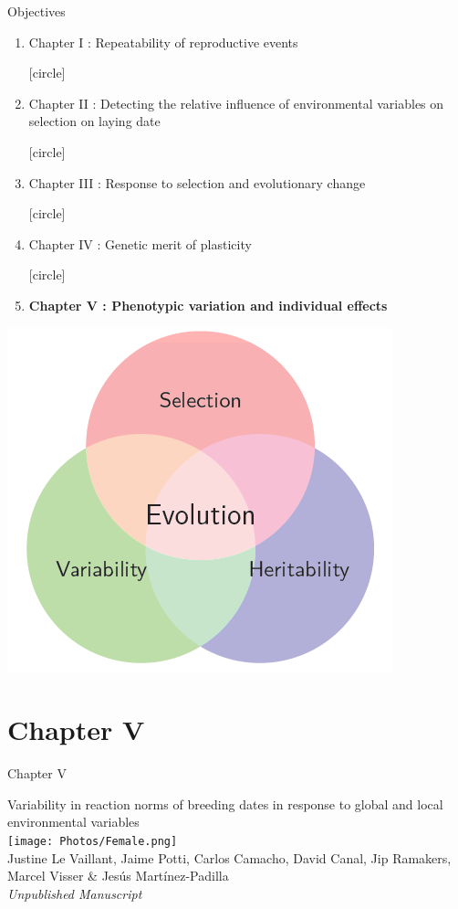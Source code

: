 \documentclass[compress]{beamer}
\begin{document}
\begin{frame}{Objectives}
   \begin{enumerate}
  [circle]
\item \normalsize Chapter I : Repeatability of reproductive events
\vspace{0.3cm}

  [circle]
\item \normalsize Chapter II : Detecting the relative influence of environmental variables on selection on laying date  
\vspace{0.3cm}

  [circle]
\item \normalsize Chapter III : Response to selection and evolutionary change
\vspace{0.3cm}

  [circle]
\item \normalsize Chapter IV : Genetic merit of plasticity 
\vspace{0.3cm}

  [circle]
\item \normalsize \textbf{Chapter V : Phenotypic variation and individual effects}
\end{enumerate}

\vspace{0.5cm}
\centering
  \includegraphics[height = 3.5 cm]{Image/evolution.png} 

\end{frame}
\section{Chapter V}
\begin{frame}{Chapter V}

\centering 
\large{Variability in reaction norms of breeding dates in
response to global and local environmental variables
} \\
\vfill
\texttt{[image: Photos/Female.png]}\\
Justine Le Vaillant, Jaime Potti, Carlos Camacho, David Canal, Jip Ramakers, Marcel Visser \& Jes\'{u}s Mart\'{i}nez-Padilla \\
\vfill \small{\textit{Unpublished Manuscript}
}

\end{frame}
\end{document}
